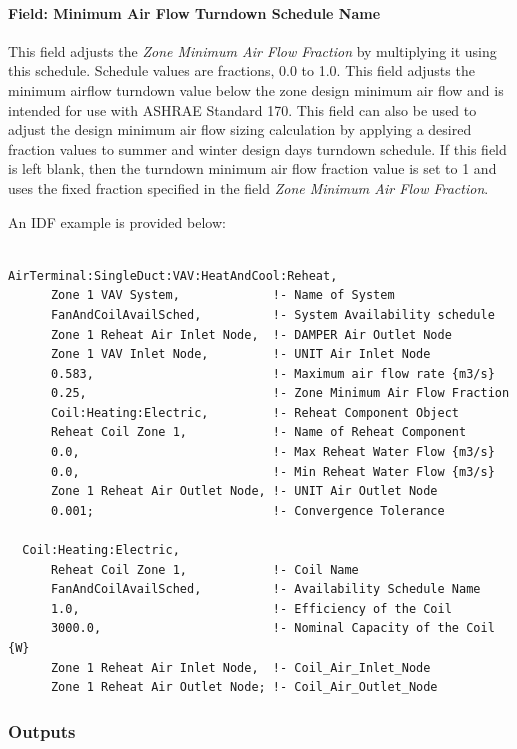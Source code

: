 \paragraph{Field: Minimum Air Flow Turndown Schedule Name}

This field adjusts the \textit{Zone Minimum Air Flow Fraction} by multiplying it using this schedule. Schedule values are fractions, 0.0 to 1.0. This field adjusts the minimum airflow turndown value below the zone design minimum air flow and is intended for use with ASHRAE Standard 170. This field can also be used to adjust the design minimum air flow sizing calculation by applying a desired fraction values to summer and winter design days turndown schedule. If this field is left blank, then the turndown minimum air flow fraction value is set to 1 and uses the fixed fraction specified in the field \textit{Zone Minimum Air Flow Fraction}.

An IDF example is provided below:

\begin{lstlisting}

AirTerminal:SingleDuct:VAV:HeatAndCool:Reheat,
      Zone 1 VAV System,             !- Name of System
      FanAndCoilAvailSched,          !- System Availability schedule
      Zone 1 Reheat Air Inlet Node,  !- DAMPER Air Outlet Node
      Zone 1 VAV Inlet Node,         !- UNIT Air Inlet Node
      0.583,                         !- Maximum air flow rate {m3/s}
      0.25,                          !- Zone Minimum Air Flow Fraction
      Coil:Heating:Electric,         !- Reheat Component Object
      Reheat Coil Zone 1,            !- Name of Reheat Component
      0.0,                           !- Max Reheat Water Flow {m3/s}
      0.0,                           !- Min Reheat Water Flow {m3/s}
      Zone 1 Reheat Air Outlet Node, !- UNIT Air Outlet Node
      0.001;                         !- Convergence Tolerance

  Coil:Heating:Electric,
      Reheat Coil Zone 1,            !- Coil Name
      FanAndCoilAvailSched,          !- Availability Schedule Name
      1.0,                           !- Efficiency of the Coil
      3000.0,                        !- Nominal Capacity of the Coil {W}
      Zone 1 Reheat Air Inlet Node,  !- Coil_Air_Inlet_Node
      Zone 1 Reheat Air Outlet Node; !- Coil_Air_Outlet_Node
\end{lstlisting}

\subsubsection{Outputs}\label{outputs-4}

